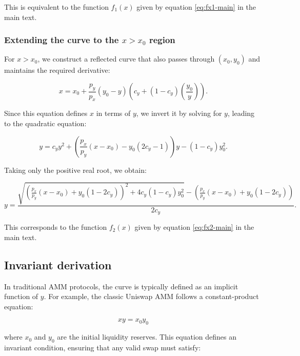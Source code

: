 \documentclass{article}
\begin{document}
This is equivalent to the function \( f_1(x) \) given by equation \eqref{eq:fx1-main} in the main text.

\subsubsection{Extending the curve to the \( x > x_0 \) region}

For \( x > x_0 \), we construct a reflected curve that also passes through \( (x_0, y_0) \) and maintains the required derivative:

\begin{equation}
    \label{eq:EulerSwap-3-inverse}
    x = x_0 + \frac{p_y}{p_x} (y_0 - y) \left( c_y + (1 - c_y) \left(\frac{y_0}{y}\right) \right).
\end{equation}

Since this equation defines \( x \) in terms of \( y \), we invert it by solving for \( y \), leading to the quadratic equation:

\begin{equation}
    y = c_y y^2 + \left( \frac{p_x}{p_y} (x - x_0) - y_0(2c_y - 1) \right)y - (1 - c_y) y_0^2.
\end{equation}

Taking only the positive real root, we obtain:

\begin{equation}
    \label{eq:EulerSwap-2}
    y = \frac{
        \sqrt{
            \left( \frac{p_x}{p_y} (x - x_0) + y_0 (1 - 2c_y) \right)^2 
            + 4c_y (1 - c_y) y_0^2
        } 
        - \left( \frac{p_x}{p_y} (x - x_0) + y_0 (1 - 2c_y) \right)
    }{2c_y}.
\end{equation}

This corresponds to the function \( f_2(x) \) given by equation \eqref{eq:fx2-main} in the main text.

\subsection{Invariant derivation}
\label{sec:invariant-derivation}

In traditional AMM protocols, the curve is typically defined as an implicit function of $y$. For example, the classic Uniswap AMM follows a constant-product equation:

\begin{equation}
    xy = x_0 y_0
\end{equation}

where $x_0$ and $y_0$ are the initial liquidity reserves. This equation defines an invariant condition, ensuring that any valid swap must satisfy:
\end{document}

